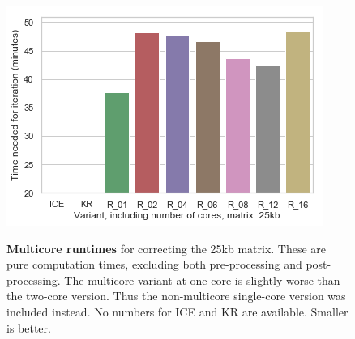 
\begin{figure}[!tbp]
    \begin{centering}
        {\includegraphics[scale=0.8]{figures/results/compute_multi_25}}
        \caption[Multicore comparison]
        {\textbf{Multicore runtimes} for correcting the 25kb matrix. These are pure
        computation times, excluding both pre-processing and post-processing. The
        multicore-variant at one core is slightly worse than the two-core version.
        Thus the non-multicore single-core version was included instead. No numbers
        for ICE and KR are available.
        Smaller is better.}
        \label{fig:computetime25}
    \end{centering}
\end{figure}


